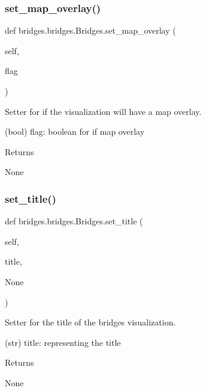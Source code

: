 \subsubsection{\texorpdfstring{set\+\_\+map\+\_\+overlay()}{set\_map\_overlay()}}
{\footnotesize\ttfamily def bridges.\+bridges.\+Bridges.\+set\+\_\+map\+\_\+overlay (\begin{DoxyParamCaption}\item[{}]{self,  }\item[{}]{flag }\end{DoxyParamCaption})}



Setter for if the visualization will have a map overlay. 

(bool) flag\+: boolean for if map overlay \begin{DoxyReturn}{Returns}


None 
\end{DoxyReturn}
\mbox{\label{classbridges_1_1bridges_1_1_bridges_a3b0c629c1ae0beaac05fa9d90846c423}} 
\subsubsection{\texorpdfstring{set\+\_\+title()}{set\_title()}}
{\footnotesize\ttfamily def bridges.\+bridges.\+Bridges.\+set\+\_\+title (\begin{DoxyParamCaption}\item[{}]{self,  }\item[{}]{title,  }\item[{}]{None }\end{DoxyParamCaption})}



Setter for the title of the bridges visualization. 

(str) title\+: representing the title \begin{DoxyReturn}{Returns}


None 
\end{DoxyReturn}
\mbox{\label{classbridges_1_1bridges_1_1_bridges_a3f97735d336faf40585e99362d64a3ee}} 
